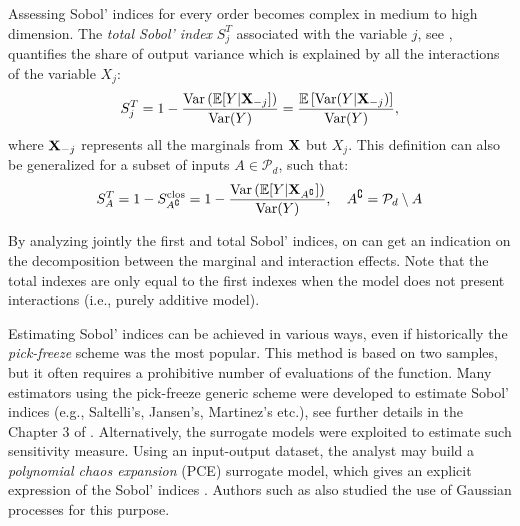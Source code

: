 Assessing Sobol' indices for every order becomes complex in medium to high dimension. 
The \textit{total Sobol' index} $S_j^T$ associated with the variable $j$, see \citet{saltelli_2008}, quantifies the share of output variance which is explained by all the interactions of the variable $X_j$:
\begin{equation}
    S_j^T = 1 - \frac{\operatorname{Var}\left(\mathbb{E}[Y|{\bf X}_{-j}]\right)}{\operatorname{Var}(Y)} = \frac{\mathbb{E}\left[\operatorname{Var}(Y|{\bf X}_{-j})\right]}{\operatorname{Var}(Y)},
    \label{eq:sobol_total}
\end{equation}
where ${\bf X}_{-j}$ represents all the marginals from ${\bf X}$ but $X_j$. 
This definition can also be generalized for a subset of inputs $A \in \mathcal{P}_d$, such that:
\begin{equation}
    S_A^T = 1 - S_{A^{\complement}}^{\mathrm{clos}} = 1 - \frac{\operatorname{Var}\left(\mathbb{E}[Y|{\bf X}_{A^{\complement}}]\right)}{\operatorname{Var}(Y)}, \quad A^{\complement}=\mathcal{P}_d \setminus A
\end{equation}

By analyzing jointly the first and total Sobol' indices, on can get an indication on the decomposition between the marginal and interaction effects. 
Note that the total indexes are only equal to the first indexes when the model does not present interactions (i.e., purely additive model).

Estimating Sobol' indices can be achieved in various ways, even if historically the \textit{pick-freeze} scheme was the most popular. 
This method is based on two samples, but it often requires a prohibitive number of evaluations of the function. 
Many estimators using the pick-freeze generic scheme were developed to estimate Sobol' indices (e.g., Saltelli's, Jansen's, Martinez's etc.), see further details in the Chapter 3 of \citet{daveiga_iooss_2021}. 
Alternatively, the surrogate models were exploited to estimate such sensitivity measure. 
Using an input-output dataset, the analyst may build a \textit{polynomial chaos expansion} (PCE) surrogate model, which gives an explicit expression of the Sobol' indices \citep{sudret_2008}. 
Authors such as \citet{marrel_2009} also studied the use of Gaussian processes for this purpose. 
  
